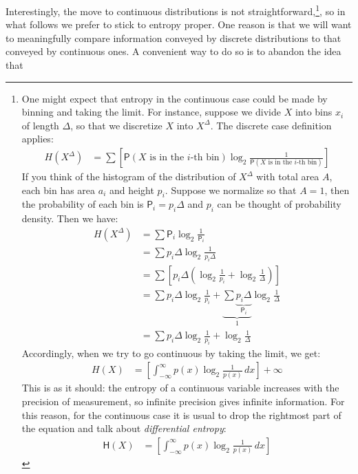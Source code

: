 \documentclass[
  10pt,
  dvipsnames,enabledeprecatedfontcommands]{scrartcl}
\begin{document}
Interestingly, the move to continuous distributions is not
straightforward,\footnote{One might expect that entropy in the
  continuous case could be made by binning and taking the limit. For
  instance, suppose we divide \(X\) into bins \(x_i\) of length
  \(\Delta\), so that we discretize \(X\) into \(X^\Delta\). The
  discrete case definition applies: \begin{align*}
  H(X^\Delta) & = \sum \left[\mathsf{P}(X \mbox{ is in the $i$-th bin}) \log_2 \frac{1}{\mathsf{P}(X \mbox{ is in the $i$-th bin})}\right]
  \end{align*} \noindent If you think of the histogram of the
  distribution of \(X^\Delta\) with total area \(A\), each bin has area
  \(a_i\) and height \(p_i\). Suppose we normalize so that \(A =1\),
  then the probability of each bin is \(\mathsf{P}_i = p_i \Delta\) and
  \(p_i\) can be thought of probability density. Then we have:
  \begin{align*}
  H(X^\Delta) & = \sum \mathsf{P}_i \log_2 \frac{1}{\mathsf{P}_i}\\
  & = \sum p_i \Delta \log_2 \frac{1}{p_i \Delta}\\
  & = \sum \left[ p_i \Delta \left(\log_2 \frac{1}{p_i} + \log_2\frac{1}{\Delta}\right)\right]\\
  & = \sum p_i \Delta \log_2 \frac{1}{p_i} +    \underbrace{\sum \underbrace{p_i \Delta}_{\mathsf{P}_i}}_1 \log_2\frac{1}{\Delta} \\
  & = \sum p_i \Delta \log_2 \frac{1}{p_i} +  \log_2\frac{1}{\Delta}
  \end{align*} \noindent Accordingly, when we try to go continuous by
  taking the limit, we get: \begin{align*}
  H(X) & = \left[\int_{-\infty}^\infty p(x) \log_2 \frac{1}{p(x)}\, dx  \right] + \infty
  \end{align*} \noindent This is as it should: the entropy of a
  continuous variable increases with the precision of measurement, so
  infinite precision gives infinite information. For this reason, for
  the continuous case it is usual to drop the rightmost part of the
  equation and talk about \emph{differential entropy}: \begin{align*}
  \mathsf{H}(X) & = \left[\int_{-\infty}^\infty p(x) \log_2 \frac{1}{p(x)}\, dx  \right] 
  \end{align*}}, so in what follows we prefer to stick to entropy
proper. One reason is that we will want to meaningfully compare
information conveyed by discrete distributions to that conveyed by
continuous ones. A convenient way to do so is to abandon the idea that
\end{document}
